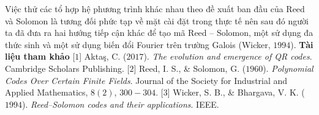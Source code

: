 \begin{multicols}{2}
\vskip 0.1cm
	Việc thử các tổ hợp hệ phương trình khác nhau theo đề xuất ban đầu của Reed và Solomon là tương đối phức tạp về mặt cài đặt trong thực tế nên sau đó người ta đã đưa ra hai hướng tiếp cận khác để tạo mã Reed -- Solomon, một sử dụng đa thức sinh và một sử dụng biến đổi Fourier trên trường Galois (Wicker, $1994$).
	\vskip 0.1cm
	\textbf{\color{toanhocdoisong}Tài liệu tham khảo}
	\vskip 0.1cm
	[$1$] Aktaş, C. ($2017$). \textit{The evolution and emergence of QR codes}. Cambridge Scholars Publishing.
	\vskip 0.1cm
	[$2$] Reed, I. S., \& Solomon, G. ($1960$). \textit{Polynomial Codes Over Certain Finite Fields}. Journal of the Society for Industrial and Applied Mathematics, $8(2)$, $300-304$. 
	[$3$] Wicker, S. B., \& Bhargava, V. K. ($1994$). \textit{Reed--Solomon codes and their applications}. IEEE.
\end{multicols}